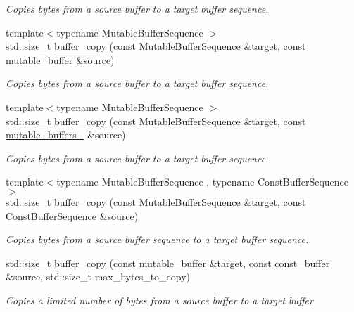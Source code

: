\begin{DoxyCompactItemize}
\begin{DoxyCompactList}\small\item\em Copies bytes from a source buffer to a target buffer sequence. \end{DoxyCompactList}\item 
{\footnotesize template$<$typename Mutable\+Buffer\+Sequence $>$ }\\std\+::size\+\_\+t \hyperlink{group__buffer__copy_ga805c350f27581373ee6c1d0fdcff92e0}{buffer\+\_\+copy} (const Mutable\+Buffer\+Sequence \&target, const \hyperlink{classasio_1_1mutable__buffer}{mutable\+\_\+buffer} \&source)
\begin{DoxyCompactList}\small\item\em Copies bytes from a source buffer to a target buffer sequence. \end{DoxyCompactList}\item 
{\footnotesize template$<$typename Mutable\+Buffer\+Sequence $>$ }\\std\+::size\+\_\+t \hyperlink{group__buffer__copy_ga77fdccbc8ef71eca2becc0ae9b5a5921}{buffer\+\_\+copy} (const Mutable\+Buffer\+Sequence \&target, const \hyperlink{classasio_1_1mutable__buffers__1}{mutable\+\_\+buffers\+\_} \&source)
\begin{DoxyCompactList}\small\item\em Copies bytes from a source buffer to a target buffer sequence. \end{DoxyCompactList}\item 
{\footnotesize template$<$typename Mutable\+Buffer\+Sequence , typename Const\+Buffer\+Sequence $>$ }\\std\+::size\+\_\+t \hyperlink{group__buffer__copy_ga0ee2be3725dff58302a47a0eb2bc72bb}{buffer\+\_\+copy} (const Mutable\+Buffer\+Sequence \&target, const Const\+Buffer\+Sequence \&source)
\begin{DoxyCompactList}\small\item\em Copies bytes from a source buffer sequence to a target buffer sequence. \end{DoxyCompactList}\item 
std\+::size\+\_\+t \hyperlink{group__buffer__copy_gaccb89801dc44bbcbf308e08dcb0c9181}{buffer\+\_\+copy} (const \hyperlink{classasio_1_1mutable__buffer}{mutable\+\_\+buffer} \&target, const \hyperlink{classasio_1_1const__buffer}{const\+\_\+buffer} \&source, std\+::size\+\_\+t max\+\_\+bytes\+\_\+to\+\_\+copy)
\begin{DoxyCompactList}\small\item\em Copies a limited number of bytes from a source buffer to a target buffer. \end{DoxyCompactList}\item 

\end{DoxyCompactItemize}
